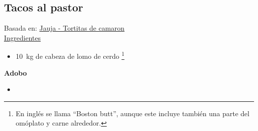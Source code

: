 \subsection{Tacos al pastor}

Basada en: \href{https://www.youtube.com/watch?v=aD8jlQKKBWQ}{Jauja - Tortitas de camaron} \\

\underline{Ingredientes}

\begin{itemize}
\item \SI{10}{kg} de cabeza de lomo de cerdo \footnote{En inglés se llama ``Boston butt'', aunque este incluye también una parte del omóplato y carne alrededor.}
\end{itemize}

\textbf{Adobo}
\begin{itemize}
\item 
\end{itemize}


